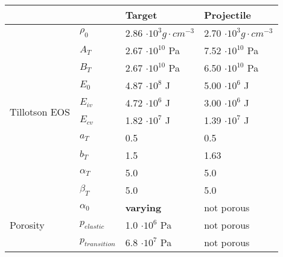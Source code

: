 \begin{table}
    \centering
    \begin{tabular}{ |l|l|l|l| }
        \hline
        \multicolumn{2}{|c|}{}                & Target                  & Projectile                                                          \\
        \hline
        \multirow{10}{*}{Tillotson EOS}       & $\rho_0$                & 2.86 $\cdot 10^3 g\cdot cm^{-3}$ & 2.70 $\cdot 10^3 g\cdot cm^{-3}$ \\
                                              & $A_T$                   & 2.67 $\cdot 10^{10}$ Pa          & 7.52 $\cdot 10^{10}$ Pa          \\
                                              & $B_T$                   & 2.67 $\cdot 10^{10}$ Pa          & 6.50 $\cdot 10^{10}$ Pa          \\
                                              & $E_0$                   & 4.87 $\cdot 10^8$ J              & 5.00 $\cdot 10^6$ J              \\
                                              & $E_{iv}$                & 4.72 $\cdot 10^6$ J              & 3.00 $\cdot 10^6$ J              \\
                                              & $E_{cv}$                & 1.82 $\cdot 10^7$ J              & 1.39 $\cdot 10^7$ J              \\
                                              & $a_T$                   & 0.5                              & 0.5                              \\
                                              & $b_T$                   & 1.5                              & 1.63                             \\
                                              & $\alpha_T$              & 5.0                              & 5.0                              \\
                                              & $\beta_T$               & 5.0                              & 5.0                              \\ \hline
        \multirow{7}{*}{Porosity}             & $\alpha_0$              & \textbf{varying}                 & not porous                       \\
                                              & $p_{elastic}$           & 1.0 $\cdot 10^6$ Pa              & not porous                       \\
                                              & $p_{transition}$        & 6.8 $\cdot 10^7$ Pa              & not porous                       \\

\end{tabular}
\end{table}
